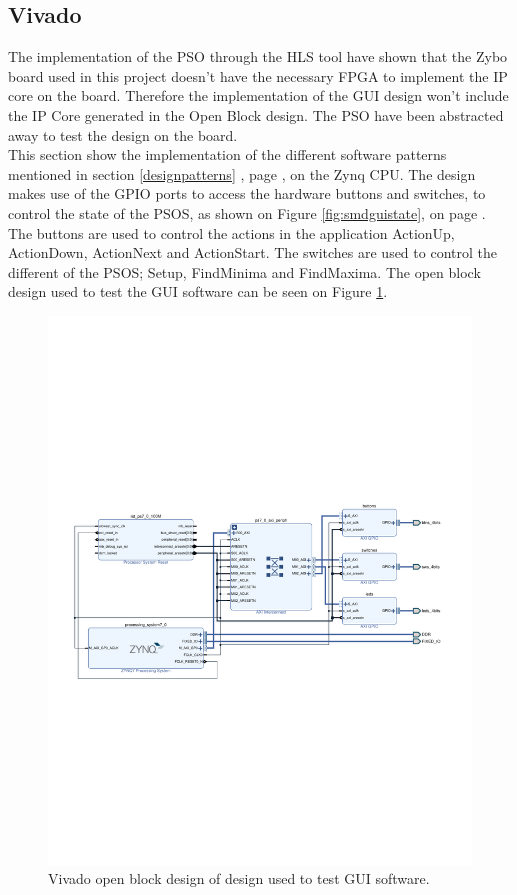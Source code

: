 \clearpage

\subsection{Vivado}
The implementation of the PSO through the HLS tool have shown that the Zybo board used in this project doesn't have the necessary FPGA to implement the IP core on the board. Therefore the implementation of the GUI design won't include the IP Core generated in the Open Block design. The PSO have been abstracted away to test the design on the board.\\

This section show the implementation of the different software patterns mentioned in section \ref{designpatterns} , page \pageref{designpatterns}, on the Zynq CPU. The design makes use of the GPIO ports to access the hardware buttons and switches, to control the state of the PSOS, as shown on Figure \ref{fig:smdguistate}, on page \pageref{fig:smdguistate}. The buttons are used to control the actions in the application ActionUp, ActionDown, ActionNext and ActionStart. The switches are used to control the different of the PSOS; Setup, FindMinima and FindMaxima. The open block design used to test the GUI software can be seen on Figure \ref{fig:vivadoblockdesign}.

\begin{figure}[H]
	\centering
	\includegraphics[trim={0 260 0 260},clip,width=1\linewidth]{diagram/VivadoBlockDesign}
	\caption{Vivado open block design of design used to test GUI software.}
	\label{fig:vivadoblockdesign}
\end{figure}

